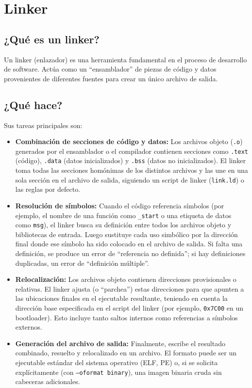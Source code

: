 \section{Linker}

\subsection{¿Qué es un linker?}
Un linker (enlazador) es una herramienta fundamental en el proceso de desarrollo de software. Actúa como un “ensamblador” de piezas de código y datos provenientes de diferentes fuentes para crear un único archivo de salida.

\subsection{¿Qué hace?}
Sus tareas principales son:

\begin{itemize}[noitemsep]
  \item \textbf{Combinación de secciones de código y datos:} Los archivos objeto (\texttt{.o}) generados por el ensamblador o el compilador contienen secciones como \texttt{.text} (código), \texttt{.data} (datos inicializados) y \texttt{.bss} (datos no inicializados). El linker toma todas las secciones homónimas de los distintos archivos y las une en una sola sección en el archivo de salida, siguiendo un script de linker (\texttt{link.ld}) o las reglas por defecto.
  
  \item \textbf{Resolución de símbolos:} Cuando el código referencia símbolos (por ejemplo, el nombre de una función como \texttt{\_start} o una etiqueta de datos como \texttt{msg}), el linker busca su definición entre todos los archivos objeto y bibliotecas de entrada. Luego sustituye cada uso simbólico por la dirección final donde ese símbolo ha sido colocado en el archivo de salida. Si falta una definición, se produce un error de “referencia no definida”; si hay definiciones duplicadas, un error de “definición múltiple”.

  \item \textbf{Relocalización:} Los archivos objeto contienen direcciones provisionales o relativas. El linker ajusta (o “parchea”) estas direcciones para que apunten a las ubicaciones finales en el ejecutable resultante, teniendo en cuenta la dirección base especificada en el script del linker (por ejemplo, \texttt{0x7C00} en un bootloader). Esto incluye tanto saltos internos como referencias a símbolos externos.

  \item \textbf{Generación del archivo de salida:} Finalmente, escribe el resultado combinado, resuelto y relocalizado en un archivo. El formato puede ser un ejecutable estándar del sistema operativo (ELF, PE) o, si se solicita explícitamente (con \texttt{--oformat binary}), una imagen binaria cruda sin cabeceras adicionales.
\end{itemize}

